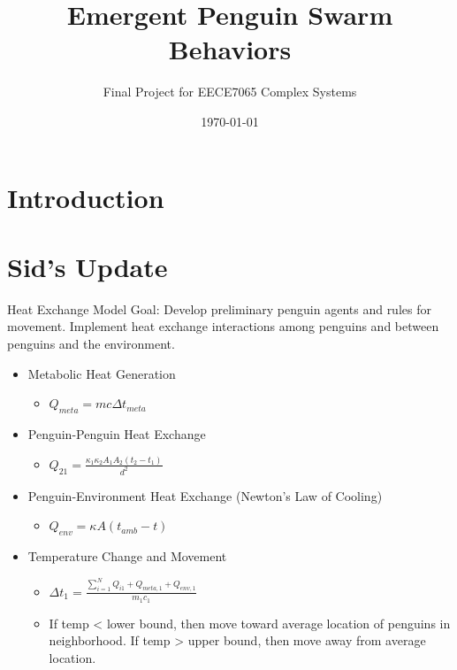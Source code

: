 \documentclass[handout,9pt]{beamer}
\title{Emergent Penguin Swarm Behaviors}
\subtitle{
    Final Project for EECE7065 Complex Systems
}
\author{
	\texorpdfstring{
		Presented by: \\
		Wayne Stegner \and Zuguang Liu \and Sid Barve
	}{Wayne Stegner, Zuguang Liu, and Sid Barve}
}
\date{\today}
\begin{document}
	\section{Introduction}
	\begin{frame}
		\centering
		\titlepage
	\end{frame}

	\section{Sid's Update}
	\begin{frame}{Heat Exchange Model}
		Goal: Develop preliminary penguin agents and rules for movement.
		Implement heat exchange interactions among penguins and between penguins
		and the environment.
		\begin{itemize}
			\item Metabolic Heat Generation
				\begin{itemize}
					\item $Q_{meta}=mc\Delta t_{meta}$
				\end{itemize}
			\item Penguin-Penguin Heat Exchange
				\begin{itemize}
					\item $Q_{21}=\frac{\kappa_{1}\kappa_{2}A_{1}A_{2}(t_{2}-t_{1})}{d^{2}}$
				\end{itemize}
			\item Penguin-Environment Heat Exchange (Newton's Law of Cooling)
				\begin{itemize}
					\item $Q_{env}=\kappa A (t_{amb}-t)$
				\end{itemize}
			\item Temperature Change and Movement
				\begin{itemize}
					\item $\Delta t_{1}=\frac{\sum_{i=1}^{N} Q_{i1}+Q_{meta,1}+Q_{env,1}}{m_{1}c_{1}}$
					\item If temp < lower bound, then move toward average location of
						penguins in neighborhood. If temp > upper bound, then move away
						from average location.
				\end{itemize}
		\end{itemize}
	\end{frame}
\end{document}
